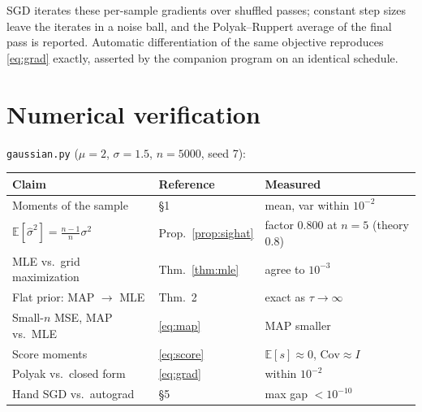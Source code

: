 \documentclass[11pt]{article}
\theoremstyle{remark}
\newcommand{\E}{\mathbb{E}}
\begin{document}
SGD iterates these per-sample gradients over shuffled passes;
constant step sizes leave the iterates in a noise ball, and the
Polyak--Ruppert average of the final pass is reported. Automatic
differentiation of the same objective reproduces \eqref{eq:grad}
exactly, asserted by the companion program on an identical schedule.

\section{Numerical verification}

\texttt{gaussian.py} ($\mu = 2$, $\sigma = 1.5$, $n = 5000$, seed 7):

\begin{center}
\begin{tabular}{lll}
\toprule
Claim & Reference & Measured\\
\midrule
Moments of the sample & \S1 & mean, var within $10^{-2}$\\
$\E[\hat\sigma^2] = \tfrac{n-1}{n}\sigma^2$ &
  Prop.~\ref{prop:sighat} & factor $0.800$ at $n{=}5$ (theory $0.8$)\\
MLE vs.\ grid maximization & Thm.~\ref{thm:mle} & agree to $10^{-3}$\\
Flat prior: MAP $\to$ MLE & Thm.~2 & exact as $\tau \to \infty$\\
Small-$n$ MSE, MAP vs.\ MLE & \eqref{eq:map} & MAP smaller\\
Score moments & \eqref{eq:score} & $\E[s] \approx 0$,
  $\mathrm{Cov} \approx I$\\
Polyak vs.\ closed form & \eqref{eq:grad} & within $10^{-2}$\\
Hand SGD vs.\ autograd & \S5 & max gap $< 10^{-10}$\\
\bottomrule
\end{tabular}
\end{center}
\end{document}
